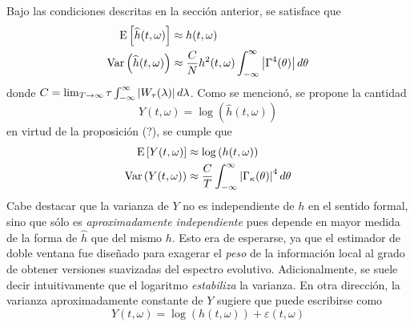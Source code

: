 Bajo las condiciones descritas en la sección anterior, se satisface que
%
\begin{align*}
\mathrm{E}\left[ \widehat{h}(t,\omega) \right] &\approx h(t,\omega) \\
\mathrm{Var}\left( \widehat{h}(t,\omega) \right) &\approx \frac{C}{N} h^{2}(t,\omega) \int_{-\infty}^{\infty} \left| \Gamma^{4}(\theta) \right| d\theta
\end{align*}
%
donde $C = \lim_{T\rightarrow \infty} \tau \int_{-\infty}^{\infty} \left| W_\tau(\lambda) \right| d\lambda$.
%
Como se mencionó, se propone la cantidad 
\begin{equation}
Y(t,\omega) = \log\left(\widehat{h}(t,\omega)\right)
\end{equation}
en virtud de la proposición (?), se cumple que
\begin{align}
\mathrm{E}\left[ Y(t,\omega) \right] &\approx \log\left(h(t,\omega)\right) \\
\mathrm{Var}\left( Y(t,\omega) \right) &\approx \frac{C}{T} \int_{-\infty}^{\infty} \left| \Gamma_\kappa(\theta) \right|^{4} d\theta \\
\end{align}
Cabe destacar que la varianza de $Y$ no es independiente de $h$ en el sentido formal, sino que 
sólo es \textit{aproximadamente independiente} pues depende en mayor medida de la forma de 
$\widehat{h}$ que del mismo $h$.
%
Esto era de esperarse, ya que el estimador de doble ventana fue diseñado para exagerar el \textit{peso} de la información local al grado de obtener versiones suavizadas del espectro evolutivo. 
%
Adicionalmente, se suele decir intuitivamente que el logaritmo \textit{estabiliza} la varianza. 
%
En otra dirección, la varianza aproximadamente constante de $Y$ sugiere que puede escribirse como
\begin{equation}
Y(t,\omega) = \log\left(h(t,\omega) \right) + \varepsilon(t,\omega)
\label{ye}
\end{equation}

%

